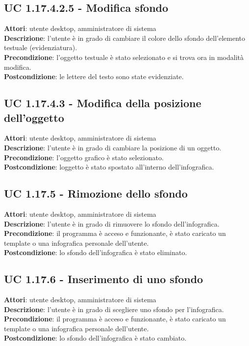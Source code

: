\subsection{UC 1.17.4.2.5 - Modifica sfondo}{
	\label{uc1.17.4.2.5}
	\textbf{Attori}: utente desktop, amministratore di sistema \\
	\textbf{Descrizione}: l'utente è in grado di cambiare il colore dello sfondo dell’elemento testuale (evidenziatura). \\
	\textbf{Precondizione}: l'oggetto testuale è stato selezionato e si trova ora in modalità modifica.\\
	\textbf{Postcondizione}: le lettere del testo sono state evidenziate.	\\
	}
\subsection{UC 1.17.4.3 - Modifica della posizione dell'oggetto}{
	\label{uc1.17.4.3}
	\textbf{Attori}: utente desktop, amministratore di sistema \\
	\textbf{Descrizione}: l'utente è in grado di cambiare la posizione di un oggetto. \\
	\textbf{Precondizione}: l'oggetto grafico è stato selezionato.\\
	\textbf{Postcondizione}: loggetto è stato spostato all’interno dell’infografica.	\\
	}
\subsection{UC 1.17.5 - Rimozione dello sfondo}{
	\label{uc1.17.5}
	\textbf{Attori}: utente desktop, amministratore di sistema \\
	\textbf{Descrizione}: l'utente è in grado di rimuovere lo sfondo dell’infografica. \\
	\textbf{Precondizione}: il programma è acceso e funzionante, è stato caricato un template o una infografica personale dell'utente.	\\
	\textbf{Postcondizione}: lo sfondo dell'infografica è stato eliminato.	\\
	}
\subsection{UC 1.17.6 - Inserimento di uno sfondo}{
	\label{uc1.17.6}
	\textbf{Attori}: utente desktop, amministratore di sistema \\
	\textbf{Descrizione}: l'utente è in grado di scegliere uno sfondo per l'infografica. \\
	\textbf{Precondizione}: il programma è acceso e funzionante, è stato caricato un template o una infografica personale dell'utente.	\\
	\textbf{Postcondizione}: lo sfondo dell'infografica è stato cambiato.	\\
	}
